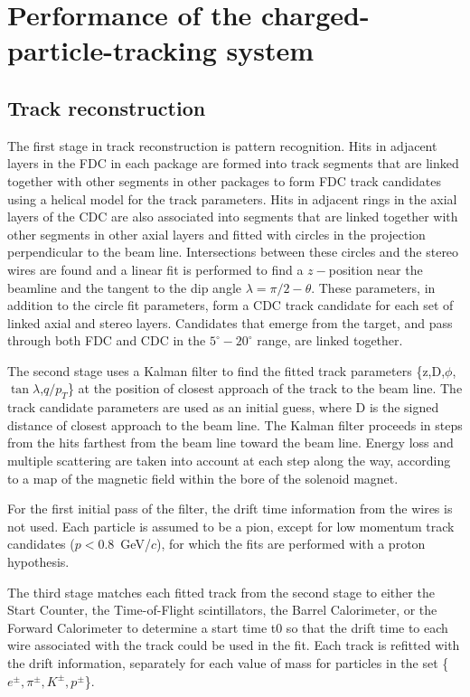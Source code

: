 \section[Performance of the charged-particle-tracking system]{Performance of the charged-particle-tracking system \label{sec:trackingperformance}}
\subsection{Track reconstruction}

The first stage in track reconstruction is pattern recognition.  Hits in adjacent
 layers in the FDC in each package are formed into track segments that are 
linked together with other segments in other packages to form FDC track 
candidates using a helical model for the track parameters.
Hits in adjacent rings in the axial layers of the CDC are also associated into 
segments that are linked together with other segments in other axial layers
and fitted with circles in the projection perpendicular to the beam line. Intersections between these circles and the stereo wires are found and a linear fit is performed to find a $z-$position near the beamline and the tangent to the dip
 angle $\lambda=\pi/2-\theta$.  These parameters, in addition to the circle fit 
parameters, form a CDC track candidate for each set of linked axial and stereo 
layers. Candidates that emerge from the target, and pass through both FDC and CDC in the  $5^\circ-20^\circ$ range, are linked together.

The second stage uses a Kalman filter \cite{KalmanFilter, KalmanFilter2} to find the fitted track parameters
\{z,D,$\phi$,$\tan\lambda$,$q/p_T$\}
at the position of closest approach of the track to the beam line. The track candidate parameters are used as an initial guess, where D is the signed distance of closest approach to the beam line.  The Kalman filter proceeds in steps from the hits farthest from the beam line toward the beam line. Energy loss and multiple scattering are taken into account at each step along the way, according to a map of the magnetic field within the bore of the solenoid magnet.

For the 
first initial pass of the filter, the drift time information from the 
wires is not used.  Each particle is assumed to be a pion, except for low momentum track 
candidates ($p<0.8$~GeV/$c$), for which the fits are performed with a proton hypothesis.

The third stage matches each fitted track from the second stage to either
the Start Counter, the Time-of-Flight scintillators, the Barrel Calorimeter, or
the Forward Calorimeter to determine a start time t0 so that the drift time to
each wire associated with the track could be used in the fit. Each track is refitted with
the drift information, separately for each value of mass for particles in the set \{$e^\pm,\pi^\pm,K^\pm,p^\pm$\}.

